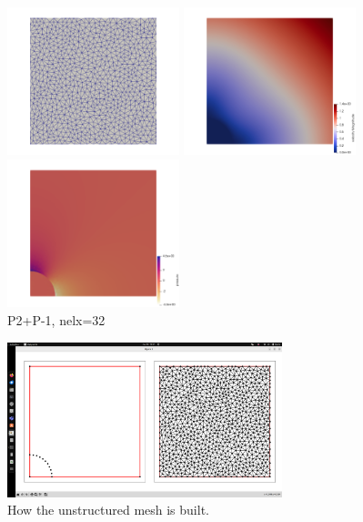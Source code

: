 \begin{center}
\includegraphics[width=5cm]{python_codes/fieldstone_120/images/solvi_mesh2}
\includegraphics[width=5cm]{python_codes/fieldstone_120/images/solvi_vel}
\includegraphics[width=5cm]{python_codes/fieldstone_120/images/solvi_press}\\
{\captionfont P2+P-1, nelx=32}
\end{center}


\begin{center}
\includegraphics[width=8cm]{python_codes/fieldstone_120/images/solvi_mesh}\\
{\captionfont How the unstructured mesh is built.}
\end{center}








